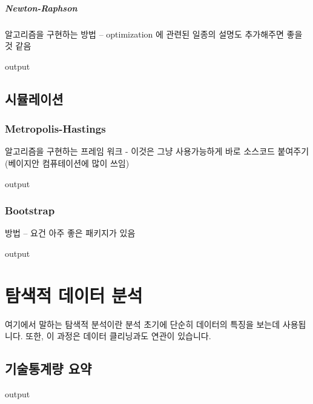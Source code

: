 \documentclass{book}
\begin{document}
\paragraph{Newton-Raphson} 알고리즘을 구현하는 방법 -- optimization 에 관련된 일종의 설명도 추가해주면 좋을 것 같음 
\begin{Schunk}
\begin{Soutput}
output
\end{Soutput}
\end{Schunk}



\section{시뮬레이션}
\subsection{Metropolis-Hastings} 알고리즘을 구현하는 프레임 워크 - 이것은 그냥 사용가능하게 바로 소스코드 붙여주기 (베이지안 컴퓨테이션에 많이 쓰임)
\begin{Schunk}
\begin{Soutput}
output
\end{Soutput}
\end{Schunk}

\subsection{Bootstrap} 
방법 -- 요건 아주 좋은 패키지가 있음 
\begin{Schunk}
\begin{Soutput}
output
\end{Soutput}
\end{Schunk}


%
%
%

\chapter{탐색적 데이터 분석}

여기에서 말하는 탐색적 분석이란 분석 초기에 단순히 데이터의 특징을 보는데 사용됩니다. 
또한, 이 과정은 데이터 클리닝과도 연관이 있습니다. 

\section{기술통계량 요약}
\begin{Schunk}
\begin{Soutput}
output
\end{Soutput}
\end{Schunk}
\end{document}
